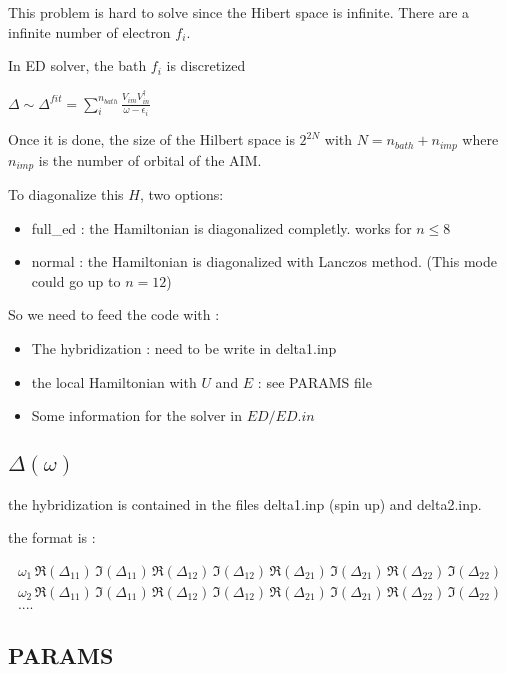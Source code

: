 \documentclass{book}
\def\D{\Delta}
\def\e{\epsilon}
\def\w{\omega}
\def\dd{\dagger}
\begin{document}
This problem is hard to solve since the Hibert space is infinite. There are a infinite number of electron $f_i$.

In ED solver, the bath $f_i$ is discretized

$\D \sim \D^{fit} =  \sum^{n_{bath}}_i \frac{V_{im} V^{\dd}_{in}}{\w-\e_i}$

Once it is done, the size of the Hilbert space  is $2^{2N}$ with $N= n_{bath}+ n_{imp}$ where $n_{imp}$ is the number of orbital of the AIM.


To diagonalize this $H$, two options:
\begin{itemize}
\item  full\_ed :  the Hamiltonian is diagonalized completly. works for  $n \leq 8$
\item  normal : the Hamiltonian is diagonalized with Lanczos method. (This mode could go up to $n = 12$)
\end{itemize}


So we need to feed the code with :


\begin{itemize}
\item The hybridization : need to be write in  delta1.inp
\item the local  Hamiltonian with $U$ and $E$ : see PARAMS file
\item Some information for the solver in $ED/ED.in$
\end{itemize}



\subsection{$\D(\w)$}

the hybridization is contained in the files delta1.inp (spin up) and delta2.inp.

the format is :

\begin{align}
  \w_1 \, \Re(\D_{11}) \,  \Im(\D_{11})\,  \Re(\D_{12}) \, \Im(\D_{12})\,  \Re(\D_{21}) \, \Im(\D_{21}) \, \Re(\D_{22}) \, \Im(\D_{22}) \nonumber\\
  \w_2 \, \Re(\D_{11}) \,  \Im(\D_{11})\,  \Re(\D_{12}) \, \Im(\D_{12})\,  \Re(\D_{21}) \, \Im(\D_{21}) \, \Re(\D_{22}) \, \Im(\D_{22}) \nonumber\\
  .... \nonumber
\end{align}


\subsection{PARAMS}
\end{document}

